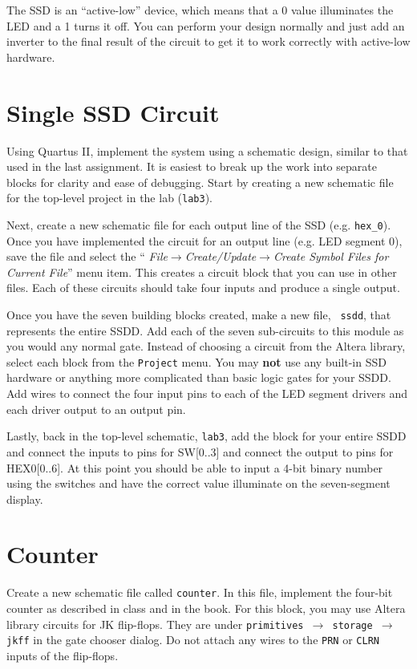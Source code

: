 \documentclass[10pt]{article}
\begin{document}
The SSD is an ``active-low'' device, which means that a 0 value
illuminates the LED and a 1 turns it off. You can perform your design
normally and just add an inverter to the final result of the circuit
to get it to work correctly with active-low hardware.

\section{Single SSD Circuit}

Using Quartus II, implement the system using a schematic design,
similar to that used in the last assignment. It is easiest to break
up the work into separate blocks for clarity and ease of
debugging. Start by creating a new schematic file for the top-level
project in the lab ({\tt lab3}).

Next, create a new schematic file for each output line of the
SSD (e.g. {\tt hex\_0}). Once you have implemented the circuit for an output line
(e.g. LED segment 0), save the file and select the ``{\it
  File$\rightarrow$Create/Update$\rightarrow$Create Symbol Files for
  Current File}'' menu item. This creates a circuit block that you can
use in other files. Each of these circuits should take four inputs and
produce a single output.

Once you have the seven building blocks created, make a new file, {\tt
  ssdd}, that represents the entire SSDD. Add each of the seven
sub-circuits to this module as you would any normal gate. Instead of
choosing a circuit from the Altera library, select each block from the
{\tt Project} menu. You may {\bf not} use any built-in SSD hardware or
anything more complicated than basic logic gates for your SSDD. Add
wires to connect the four input pins to each of the LED segment
drivers and each driver output to an output pin.

Lastly, back in the top-level schematic, {\tt lab3}, add the block for
your entire SSDD and connect the inputs to pins for SW[0..3] and
connect the output to pins for HEX0[0..6]. At this point you should
be able to input a 4-bit binary number using the switches and have the
correct value illuminate on the seven-segment display.

\section{Counter}

Create a new schematic file called {\tt counter}. In this file,
implement the four-bit counter as described in class and in the
book. For this block, you may use Altera library circuits for JK
flip-flops. They are under {\tt primitives $\rightarrow$ storage
  $\rightarrow$ jkff} in the gate chooser dialog. Do not attach any
wires to the {\tt PRN} or {\tt CLRN} inputs of the flip-flops.
\end{document}
